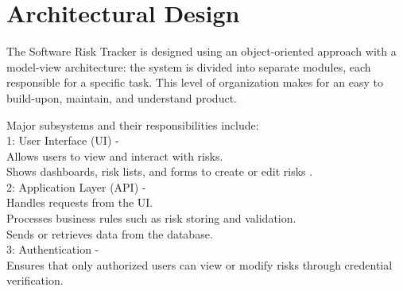 \documentclass[letterpaper,12pt,oneside,listof=totoc,parskip=full]{scrreprt}
\begin{document}
\section{Architectural Design}

The Software Risk Tracker is designed using an object-oriented approach with a model-view architecture: the system is divided into separate modules, each responsible for a specific task. This level of organization makes for an easy to build-upon, maintain, and understand product.

Major subsystems and their responsibilities include:\\

\hspace*{1cm} 1: User Interface (UI) -\\
    Allows users to view and interact with risks.\\
    Shows dashboards, risk lists, and forms to create or edit risks .~\cite{wcag21}\\

\hspace*{1cm} 2: Application Layer (API) -\\
    Handles requests from the UI.\\
    Processes business rules such as risk storing and validation.\\
    Sends or retrieves data from the database.~\cite{sei_cert_cpp}\\

\hspace*{1cm} 3: Authentication - \\
    Ensures that only authorized users can view or modify risks through credential verification.~\cite{levelaccess}\\
\end{document}
